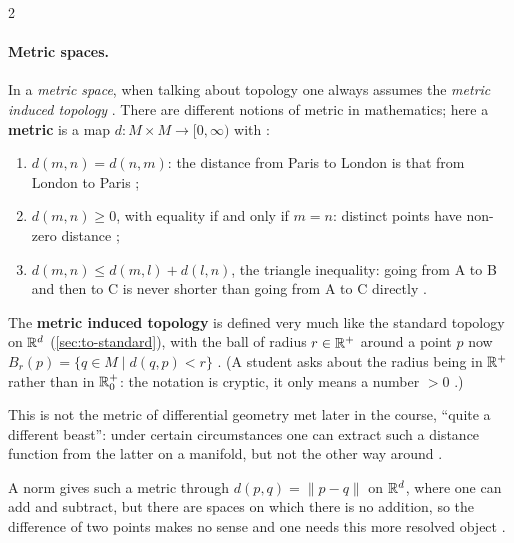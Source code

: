 \begin{paracol}{2}
\paragraph{Metric spaces.} In a \emph{metric space}, when talking about topology one always assumes the \emph{metric induced topology}
. There are different notions of metric in mathematics; here a \textbf{metric} is a map $d\colon M\times M\to[0,\infty)$ with
:
\begin{enumerate}
  \item[(a)] $d(m,n)=d(n,m)$: the distance from Paris to London is that from London to Paris ;
  \item[(b)] $d(m,n)\ge0$, with equality if and only if $m=n$: distinct points have non-zero distance ;
  \item[(c)] $d(m,n)\le d(m,l)+d(l,n)$, the triangle inequality: going from A to B and then to C is never shorter than going from A to C directly
        .
\end{enumerate}
The \textbf{metric induced topology} is defined very much like the standard topology on $\mathbb{R}^d$ (\cref{sec:to-standard}), with the ball of radius $r\in\mathbb{R}^+$
around a point $p$ now $B_r(p)=\{q\in M\mid d(q,p)<r\}$ .
(A student asks about the radius being in $\mathbb{R}^+$ rather than in $\mathbb{R}^+_0$: the notation is cryptic, it only means a number $>0$ .)
\begin{coursenote}
This is not the metric of differential geometry met later in the course, ``quite a different beast'': under certain circumstances one can extract such
a distance function from the latter on a manifold, but not the other way around .
\end{coursenote}
A norm gives such a metric through $d(p,q)=\|p-q\|$ on $\mathbb{R}^d$, where one can add and subtract, but there are spaces on which there is no addition, so the
difference of two points makes no sense and one needs this more resolved object .


\end{paracol}
